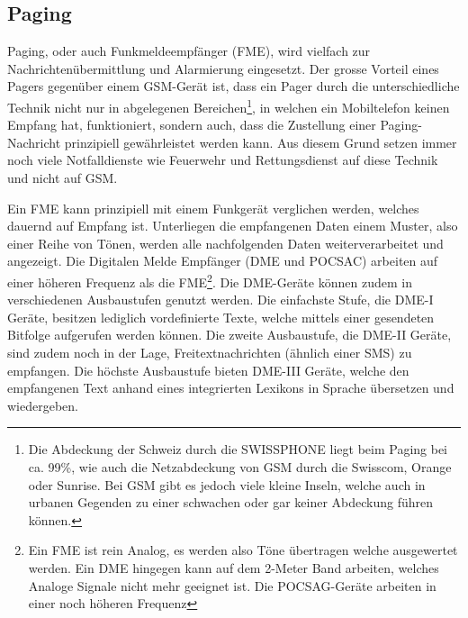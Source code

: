 \subsection{Paging} \label{sec:theorie-alert-paging}
Paging, oder auch Funkmeldeempf\"anger (FME), wird vielfach zur Nachrichten\"ubermittlung und Alarmierung eingesetzt. Der grosse Vorteil eines Pagers gegen\"uber einem GSM-Ger\"at ist, dass ein Pager durch die unterschiedliche Technik nicht nur in abgelegenen Bereichen\footnote{Die Abdeckung der Schweiz durch die SWISSPHONE liegt beim Paging bei ca. 99\%, wie auch die Netzabdeckung von GSM durch die Swisscom, Orange oder Sunrise. Bei GSM gibt es jedoch viele kleine Inseln, welche auch in urbanen Gegenden zu einer schwachen oder gar keiner Abdeckung f\"uhren k\"onnen.}, in welchen ein Mobiltelefon keinen Empfang hat, funktioniert, sondern auch, dass die Zustellung einer Paging-Nachricht prinzipiell gew\"ahrleistet werden kann. Aus diesem Grund setzen immer noch viele Notfalldienste wie Feuerwehr und Rettungsdienst auf diese Technik und nicht auf GSM.

Ein FME kann prinzipiell mit einem Funkger\"at verglichen werden, welches dauernd auf Empfang ist. Unterliegen die empfangenen Daten einem Muster, also einer Reihe von T\"onen, werden alle nachfolgenden Daten weiterverarbeitet und angezeigt. Die Digitalen Melde Empf\"anger (DME und POCSAC) arbeiten auf einer h\"oheren Frequenz als die FME\footnote{Ein FME ist rein Analog, es werden also T\"one \"ubertragen welche ausgewertet werden. Ein DME hingegen kann auf dem 2-Meter Band arbeiten, welches Analoge Signale nicht mehr geeignet ist. Die POCSAG-Ger\"ate arbeiten in einer noch h\"oheren Frequenz}. Die DME-Ger\"ate k\"onnen zudem in verschiedenen Ausbaustufen genutzt werden. Die einfachste Stufe, die DME-I Ger\"ate, besitzen lediglich vordefinierte Texte, welche mittels einer gesendeten Bitfolge aufgerufen werden k\"onnen. Die zweite Ausbaustufe, die DME-II Ger\"ate, sind zudem noch in der Lage, Freitextnachrichten (\"ahnlich einer SMS) zu empfangen. Die h\"ochste Ausbaustufe bieten DME-III Ger\"ate, welche den empfangenen Text anhand eines integrierten Lexikons in Sprache \"ubersetzen und wiedergeben.

